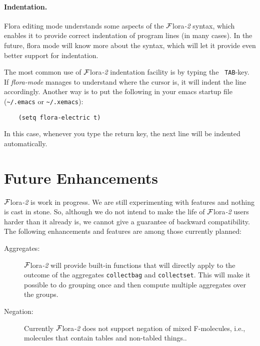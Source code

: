 \documentclass[11pt]{article}
\newcommand{\FLORA}{{\mbox{${\cal F}${\sc lora}\rm\emph{-2}}}\xspace}
\begin{document}
\paragraph{Indentation.}
Flora editing mode understands some aspects of the \FLORA syntax, which
enables it to provide correct indentation of program lines (in many cases).
In the future, flora mode will know more about the syntax, which will let
it provide even better support for indentation.

The most common use of \FLORA indentation facility is by typing the {\tt
  TAB}-key. If \emph{flora-mode} manages to understand where the cursor is,
it will indent the line accordingly. Another way is to put the following in
your emacs startup file (\verb|~/.emacs| or \verb|~/.xemacs|):
\begin{verbatim}
    (setq flora-electric t)  
\end{verbatim}
In this case, whenever you type the return key, the next line will be
indented automatically.





\section{Future Enhancements}

\FLORA is work in progress. We are still experimenting with features and
nothing is cast in stone. So, although we do not intend to make the life of 
\FLORA users harder than it already is, we cannot give a guarantee of
backward compatibility. The following enhancements and features are among
those currently planned:

\begin{description}
  \item[Aggregates:] \FLORA will provide built-in functions that will
    directly apply to the outcome of the aggregates {\tt collectbag} and
    {\tt collectset}. This will make it possible to do grouping once and
    then compute multiple aggregates over the groups.
  \item[Negation:] Currently \FLORA does not support negation of mixed
    F-molecules, i.e., molecules that contain tables and non-tabled
    things..
\end{description}




\printindex
\end{document}
